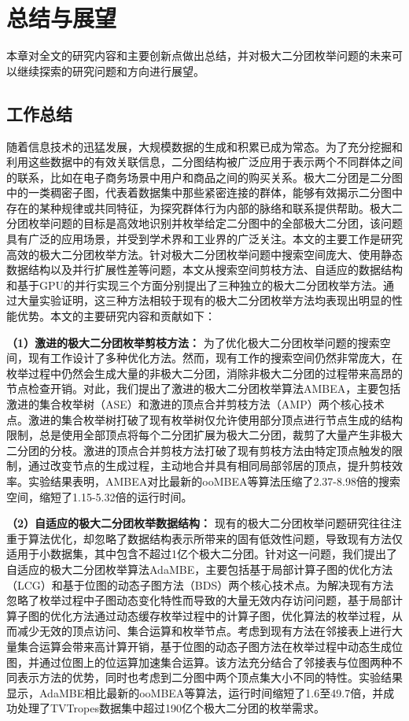 \chapter{总结与展望}

本章对全文的研究内容和主要创新点做出总结，并对极大二分团枚举问题的未来可以继续探索的研究问题和方向进行展望。

\section{工作总结}

随着信息技术的迅猛发展，大规模数据的生成和积累已成为常态。为了充分挖掘和利用这些数据中的有效关联信息，二分图结构被广泛应用于表示两个不同群体之间的联系，比如在电子商务场景中用户和商品之间的购买关系。极大二分团是二分图中的一类稠密子图，代表着数据集中那些紧密连接的群体，能够有效揭示二分图中存在的某种规律或共同特征，为探究群体行为内部的脉络和联系提供帮助。极大二分团枚举问题的目标是高效地识别并枚举给定二分图中的全部极大二分团，该问题具有广泛的应用场景，并受到学术界和工业界的广泛关注。本文的主要工作是研究高效的极大二分团枚举方法。针对极大二分团枚举问题中搜索空间庞大、使用静态数据结构以及并行扩展性差等问题，本文从搜索空间剪枝方法、自适应的数据结构和基于GPU的并行实现三个方面分别提出了三种独立的极大二分团枚举方法。通过大量实验证明，这三种方法相较于现有的极大二分团枚举方法均表现出明显的性能优势。本文的主要研究内容和贡献如下：

\textbf{（1）激进的极大二分团枚举剪枝方法：} 为了优化极大二分团枚举问题的搜索空间，现有工作设计了多种优化方法。然而，现有工作的搜索空间仍然非常庞大，在枚举过程中仍然会生成大量的非极大二分团，消除非极大二分团的过程带来高昂的节点检查开销。对此，我们提出了激进的极大二分团枚举算法AMBEA，主要包括激进的集合枚举树（ASE）和激进的顶点合并剪枝方法（AMP）两个核心技术点。激进的集合枚举树打破了现有枚举树仅允许使用部分顶点进行节点生成的结构限制，总是使用全部顶点将每个二分团扩展为极大二分团，裁剪了大量产生非极大二分团的分枝。激进的顶点合并剪枝方法打破了现有剪枝方法由特定顶点触发的限制，通过改变节点的生成过程，主动地合并具有相同局部邻居的顶点，提升剪枝效率。实验结果表明，AMBEA对比最新的ooMBEA等算法压缩了2.37-8.98倍的搜索空间，缩短了1.15-5.32倍的运行时间。

\textbf{（2）自适应的极大二分团枚举数据结构：} 现有的极大二分团枚举问题研究往往注重于算法优化，却忽略了数据结构表示所带来的固有低效性问题，导致现有方法仅适用于小数据集，其中包含不超过1亿个极大二分团。针对这一问题，我们提出了自适应的极大二分团枚举算法AdaMBE，主要包括基于局部计算子图的优化方法（LCG）和基于位图的动态子图方法（BDS）两个核心技术点。为解决现有方法忽略了枚举过程中子图动态变化特性而导致的大量无效内存访问问题，基于局部计算子图的优化方法通过动态缓存枚举过程中的计算子图，优化算法的枚举过程，从而减少无效的顶点访问、集合运算和枚举节点。考虑到现有方法在邻接表上进行大量集合运算会带来高计算开销，基于位图的动态子图方法在枚举过程中动态生成位图，并通过位图上的位运算加速集合运算。该方法充分结合了邻接表与位图两种不同表示方法的优势，同时也考虑到二分图中两个顶点集大小不同的特性。实验结果显示，AdaMBE相比最新的ooMBEA等算法，运行时间缩短了1.6至49.7倍，并成功处理了TVTropes数据集中超过190亿个极大二分团的枚举需求。

